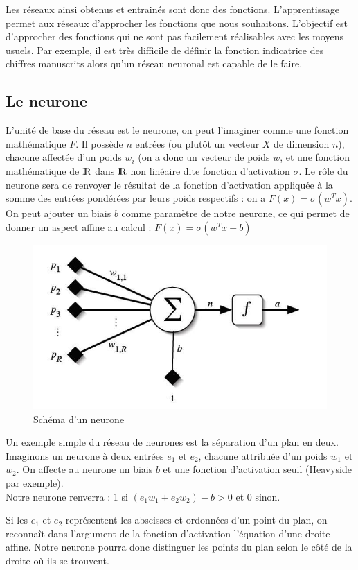 Les réseaux ainsi obtenus et entrainés sont donc des fonctions. L'apprentissage permet aux réseaux d'approcher les fonctions que nous souhaitons. L'objectif est d'approcher des fonctions qui ne sont pas facilement réalisables avec les moyens usuels. Par exemple, il est très difficile de définir la fonction indicatrice des chiffres manuscrits alors qu'un réseau neuronal est capable de le faire.

\subsection{Le neurone} %
\label{sub:le_neurone}
L’unité de base du réseau est le neurone, on peut l’imaginer comme une fonction mathématique $F$. Il possède $n$ entrées (ou plutôt un vecteur $X$ de dimension $n$), chacune affectée d’un poids $w_i$ (on a donc un vecteur de poids $w$, et une fonction mathématique de $\textrm{I\kern-0.21emR}$ dans $\textrm{I\kern-0.21emR}$ non linéaire dite fonction d'activation $\sigma$. Le rôle du neurone sera de renvoyer le résultat de la fonction d'activation appliquée à la somme des entrées pondérées par leurs poids respectifs : on a $F(x) = \sigma(w^T x)$. On peut ajouter un biais $b$ comme paramètre de notre neurone, ce qui permet de donner un aspect affine au calcul : $F(x) = \sigma(w^T x + b)$

\begin{figure}[h]
  \centerline{\includegraphics[width=0.6\linewidth]{fig/schemaneurone.jpg}}
  \caption{Schéma d'un neurone}
  \label{fig:neurone}
\end{figure}

Un exemple simple du réseau de neurones est la séparation d’un plan en deux.\\
Imaginons un neurone à deux entrées $e_1$ et $e_2$, chacune attribuée d’un poids $w_1$ et $w_2$. On affecte au neurone un biais $b$ et une fonction d’activation seuil (Heavyside par exemple).\\
Notre neurone renverra : 1 si $(e_1w_1+e_2w_2) - b >0$ et 0 sinon.

Si les $e_1$ et $e_2$ représentent les abscisses et ordonnées d’un point du plan, on reconnaît dans l’argument de la fonction d’activation l’équation d’une droite affine. Notre neurone pourra donc distinguer les points du plan selon le côté de la droite où ils se trouvent.

